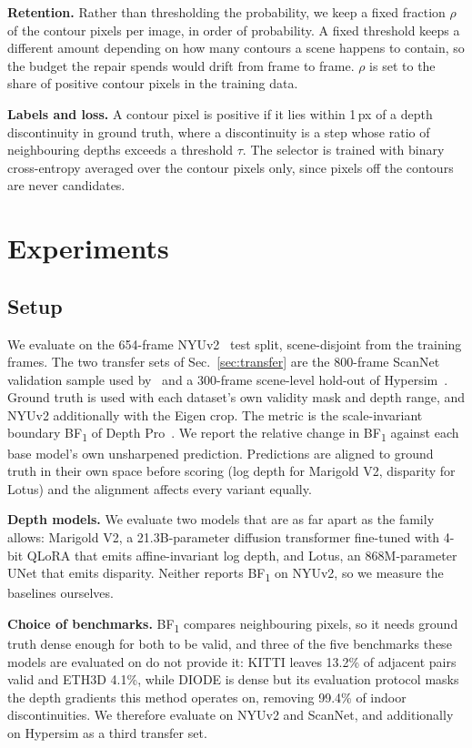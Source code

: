 \documentclass[conference]{IEEEtran}
\newcommand{\bfone}{BF\textsubscript{1}}
\begin{document}
\textbf{Retention.} Rather than thresholding the probability, we keep a fixed
fraction $\rho$ of the contour pixels per image, in order of probability. A
fixed threshold keeps a different amount depending on how many contours a scene
happens to contain, so the budget the repair spends would drift from frame to
frame. $\rho$ is set to the share of positive contour pixels in the training
data.

\textbf{Labels and loss.} A contour pixel is positive if it lies within 1\,px of
a depth discontinuity in ground truth, where a discontinuity is a step whose
ratio of neighbouring depths exceeds a threshold $\tau$. The selector is trained
with binary cross-entropy averaged over the contour pixels only, since pixels off
the contours are never candidates.

\section{Experiments}
\label{sec:experiments}

\subsection{Setup}

We evaluate on the 654-frame NYUv2~\cite{nyuv2} test split, scene-disjoint from
the training frames. The two transfer sets of Sec.~\ref{sec:transfer} are the
800-frame ScanNet~\cite{scannet} validation sample used by~\cite{marigoldv2} and
a 300-frame scene-level hold-out of Hypersim~\cite{hypersim}. Ground truth is
used with each dataset's own validity mask and depth range, and NYUv2
additionally with the Eigen crop. The metric is the
scale-invariant boundary \bfone{} of Depth Pro~\cite{depthpro}. We report the
relative change in \bfone{} against each base model's own unsharpened
prediction. Predictions are aligned to ground truth in their own space before
scoring (log depth for Marigold V2, disparity for Lotus) and the alignment
affects every variant equally.

\textbf{Depth models.} We evaluate two models that are as far apart as the family
allows: Marigold V2, a 21.3B-parameter diffusion transformer fine-tuned with
4-bit QLoRA that emits affine-invariant log depth, and Lotus, an 868M-parameter
UNet that emits disparity. Neither reports \bfone{} on NYUv2, so we measure the
baselines ourselves.

\textbf{Choice of benchmarks.} \bfone{} compares neighbouring
pixels, so it needs ground truth dense enough for both to be valid, and three of
the five benchmarks these models are evaluated on do not provide it: KITTI
\cite{kitti} leaves 13.2\% of adjacent pairs valid and ETH3D \cite{eth3d} 4.1\%,
while DIODE \cite{diode} is dense but its evaluation protocol masks the depth
gradients this method operates on, removing 99.4\% of indoor discontinuities. We
therefore evaluate on NYUv2 and ScanNet, and additionally on Hypersim as a third
transfer set.
\end{document}
